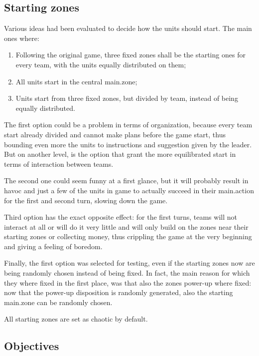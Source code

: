		\subsection{Starting zones}
			
			Various ideas had been evaluated to decide how the units should start.
			The main ones where: 
			
			\begin{enumerate}
				\item Following the original game, three fixed zones shall be the starting ones for every team, with the units equally distributed on them;
				\item All units start in the central main.zone;
				\item Units start from three fixed zones, but divided by team, instead of being equally distributed.
			\end{enumerate}
			
			The first option could be a problem in terms of organization, because every team start already divided and cannot make plans before the game start, thus bounding even more the units to instructions and suggestion given by the leader.
			But on another level, is the option that grant the more equilibrated start in terms of interaction between teams.
			
			The second one could seem funny at a first glance, but it will probably result in havoc and just a few of the units in game to actually succeed in their main.action for the first and second turn, slowing down the game.
			
			Third option has the exact opposite effect: for the first turns, teams will not interact at all or will do it very little and will only build on the zones near their starting zones or collecting money, thus crippling the game at the very beginning and giving a feeling of boredom. 
			
			Finally, the first option was selected for testing, even if the starting zones now are being randomly chosen instead of being fixed.
			In fact, the main reason for which they where fixed in the first place, was that also the zones power-up where fixed: now that the power-up disposition is randomly generated, also the starting main.zone can be randomly chosen.
			
			All starting zones are set as chaotic by default.
		
		\subsection{Objectives}
			
